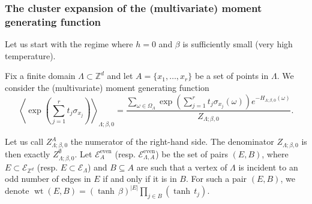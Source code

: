 \documentclass{amsart}
\newcommand{\field}[1]{\mathbb{#1}}
\newcommand{\Z}{\field{Z}}
\DeclareMathOperator\wt{wt}
\def\EEE{\mathcal{E}}
\numberwithin{equation}{section}
\theoremstyle{remark}
\begin{document}
\subsubsection{The cluster expansion of the (multivariate) moment generating function}
Let us start with the regime where $h=0$ and $\beta$ is sufficiently small (very high temperature).

Fix a finite domain $\Lambda \subset \Z^d$ and let $A=\{x_1,\dots,x_r\}$ be a set of points in $\Lambda$.
We consider the (multivariate) moment generating function
\[ \left\langle \exp\left(\sum_{j=1}^r t_j \sigma_{x_j} \right) \right\rangle_{\Lambda;\beta,0} = 
\frac{\sum_{\omega \in \Omega_{\Lambda}} 
\exp\left(\sum_{j=1}^r t_j \sigma_{x_j}(\omega) \right) e^{-H_{\Lambda;\beta,0}(\omega)}}{Z_{\Lambda; \beta,0}}.\]

Let us call $Z^A_{\Lambda; \beta,0}$ the numerator of the right-hand side.
The denominator $Z_{\Lambda; \beta,0}$ is then exactly $Z^\emptyset_{\Lambda; \beta,0}$.
Let $\mathcal{E}^{\text{even}}_{A}$ (resp. $\mathcal{E}^{\text{even}}_{\Lambda,A}$) be the set of
pairs $(E,B)$, where $E \subset \EEE_{\Z^d}$ (resp. $E \subset \EEE_\Lambda$) and $B\subseteq A$ are such that
a vertex of $\Lambda$ is incident to an odd number of edges in $E$ if and only if it is in $B$.
For such a pair $(E,B)$, we denote $\wt(E,B)=(\tanh\, \beta)^{|E|} \prod_{j \in B} (\tanh\, t_j)$.
\end{document}
